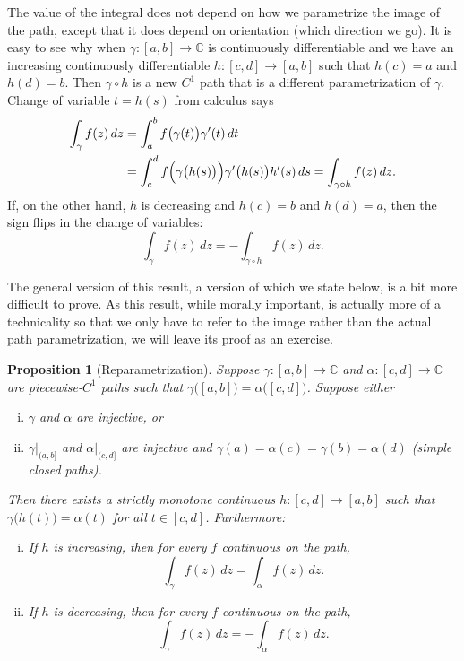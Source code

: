 \documentclass[12pt,openany]{book}
\newcommand{\C}{{\mathbb{C}}}
\theoremstyle{plain}
\newtheorem{prop}[thm]{Proposition}
\theoremstyle{remark}
\theoremstyle{definition}
\theoremstyle{exercise}
\theoremstyle{example}
\begin{document}
The value of the integral does not depend on how we parametrize the image of
the path, except that it does depend on orientation (which direction we
go).  It is easy to see why when
$\gamma \colon [a,b] \to \C$ is continuously differentiable and we have
an increasing continuously differentiable $h \colon [c,d] \to [a,b]$ such
that $h(c)=a$ and $h(d) = b$.  Then $\gamma \circ h$ is a new
$C^1$ path that is a different parametrization of $\gamma$.
Change of variable $t=h(s)$ from calculus says
\begin{equation*}
\begin{split}
\int_{\gamma} f(z) \, dz
& =
\int_a^b f\bigl( \gamma(t) \bigr) \gamma'(t) \, dt
\\
& =
\int_c^d f\Bigl( \gamma\bigl(h(s)\bigr) \Bigr) \gamma'\bigl(h(s)\bigr) h'(s) \, ds
=
\int_{\gamma \circ h} f(z) \, dz.
\end{split}
\end{equation*}
If, on the other hand, $h$ is decreasing and $h(c)=b$ and $h(d)=a$, then the
sign flips in the change of variables:
\begin{equation*}
\int_{\gamma} f(z) \, dz =
- \int_{\gamma \circ h} f(z) \, dz.
\end{equation*}

The general version of this result, a version of which we state below,
is a bit more difficult to prove.
As this result, while
morally important, is actually more of a technicality so that we only have
to refer to the image rather than the actual path parametrization, we will
leave its proof as an exercise.

\begin{prop}[Reparametrization]%
Suppose $\gamma \colon [a,b] \to \C$ and $\alpha \colon [c,d] \to \C$ are
piecewise-$C^1$ paths such that
$\gamma\bigl([a,b]\bigr) = \alpha\bigl([c,d]\bigr)$.
Suppose either
\begin{enumerate}[(i)]
\item
$\gamma$ and $\alpha$ are injective, or
\item
$\gamma|_{(a,b]}$ and
$\alpha|_{(c,d]}$ are injective and 
$\gamma(a)=\alpha(c)=\gamma(b)=\alpha(d)$ (simple closed paths).
\end{enumerate}
Then there exists a strictly monotone continuous $h \colon [c,d] \to [a,b]$ such
that $\gamma\bigl(h(t)\bigr) = \alpha(t)$ for all $t \in [c,d]$.
Furthermore:
\begin{enumerate}[(i)]
\item
If $h$ is increasing, then for every $f$ continuous on the path,
\begin{equation*}
\int_\gamma f(z) \, dz = \int_{\alpha} f(z) \, dz .
\end{equation*}
\item
If $h$ is decreasing, then for every $f$ continuous on the path,
\begin{equation*}
\int_\gamma f(z) \, dz = - \int_{\alpha} f(z) \, dz .
\end{equation*}
\end{enumerate}
\end{prop}
\end{document}
